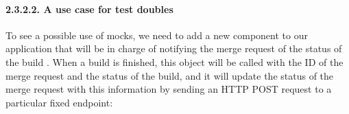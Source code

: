 \documentclass[a4paper,10pt,english]{sphinxmanual}
\begin{document}
\paragraph{2.3.2.2. A use case for test doubles}
\label{\detokenize{chapters/8_unit_testing/index:a-use-case-for-test-doubles}}
To see a possible use of mocks, we need to add a new component to our application that
will be in charge of notifying the merge request of the status of the build . When a build
is finished, this object will be called with the ID of the merge request and the status of the
build, and it will update the status of the merge request with this information by
sending an HTTP POST request to a particular fixed endpoint:

\begin{sphinxVerbatim}[commandchars=\\\{\}]
   
 
   


 
       
         

       
          
             
             
             
           
         
\end{sphinxVerbatim}
\end{document}
